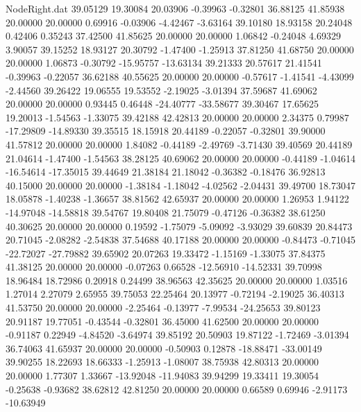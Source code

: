 \begin{filecontents}{NodeRight.dat}
  39.05129   19.30084   20.03906    -0.39963   -0.32801   36.88125   41.85938   20.00000   20.00000    0.69916   -0.03906   -4.42467   -3.63164
  39.10180   18.93158   20.24048     0.42406    0.35243   37.42500   41.85625   20.00000   20.00000    1.06842   -0.24048    4.69329    3.90057
  39.15252   18.93127   20.30792    -1.47400   -1.25913   37.81250   41.68750   20.00000   20.00000    1.06873   -0.30792  -15.95757  -13.63134
  39.21333   20.57617   21.41541    -0.39963   -0.22057   36.62188   40.55625   20.00000   20.00000   -0.57617   -1.41541   -4.43099   -2.44560
  39.26422   19.06555   19.53552    -2.19025   -3.01394   37.59687   41.69062   20.00000   20.00000    0.93445    0.46448  -24.40777  -33.58677
  39.30467   17.65625   19.20013    -1.54563   -1.33075   39.42188   42.42813   20.00000   20.00000    2.34375    0.79987  -17.29809  -14.89330
  39.35515   18.15918   20.44189    -0.22057   -0.32801   39.90000   41.57812   20.00000   20.00000    1.84082   -0.44189   -2.49769   -3.71430
  39.40569   20.44189   21.04614    -1.47400   -1.54563   38.28125   40.69062   20.00000   20.00000   -0.44189   -1.04614  -16.54614  -17.35015
  39.44649   21.38184   21.18042    -0.36382   -0.18476   36.92813   40.15000   20.00000   20.00000   -1.38184   -1.18042   -4.02562   -2.04431
  39.49700   18.73047   18.05878    -1.40238   -1.36657   38.81562   42.65937   20.00000   20.00000    1.26953    1.94122  -14.97048  -14.58818
  39.54767   19.80408   21.75079    -0.47126   -0.36382   38.61250   40.30625   20.00000   20.00000    0.19592   -1.75079   -5.09092   -3.93029
  39.60839   20.84473   20.71045    -2.08282   -2.54838   37.54688   40.17188   20.00000   20.00000   -0.84473   -0.71045  -22.72027  -27.79882
  39.65902   20.07263   19.33472    -1.15169   -1.33075   37.84375   41.38125   20.00000   20.00000   -0.07263    0.66528  -12.56910  -14.52331
  39.70998   18.96484   18.72986     0.20918    0.24499   38.96563   42.35625   20.00000   20.00000    1.03516    1.27014    2.27079    2.65955
  39.75053   22.25464   20.13977    -0.72194   -2.19025   36.40313   41.53750   20.00000   20.00000   -2.25464   -0.13977   -7.99534  -24.25653
  39.80123   20.91187   19.77051    -0.43544   -0.32801   36.45000   41.62500   20.00000   20.00000   -0.91187    0.22949   -4.84520   -3.64974
  39.85192   20.50903   19.87122    -1.72469   -3.01394   36.74063   41.65937   20.00000   20.00000   -0.50903    0.12878  -18.88471  -33.00149
  39.90255   18.22693   18.66333    -1.25913   -1.08007   38.75938   42.80313   20.00000   20.00000    1.77307    1.33667  -13.92048  -11.94083
  39.94299   19.33411   19.30054    -0.25638   -0.93682   38.62812   42.81250   20.00000   20.00000    0.66589    0.69946   -2.91173  -10.63949

\end{filecontents}
